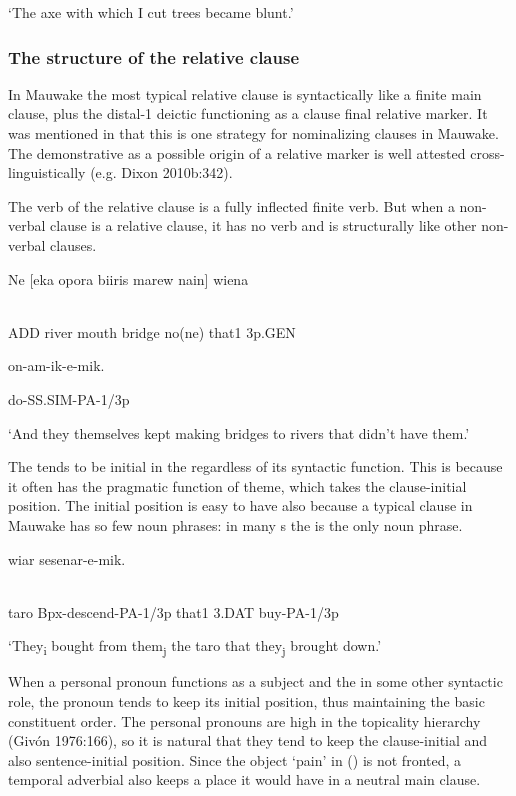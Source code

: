 `The axe with which I cut trees became blunt.'

\subsubsection[The structure of the relative clause ]{The structure of the relative clause} 
\hypertarget{RefHeading23341935131865}{}
In Mauwake the most typical relative clause is syntactically like a finite main clause, plus the distal-1 deictic  functioning as a clause final relative marker. It was mentioned in  that this is one strategy for nominalizing clauses in Mauwake. The demonstrative as a possible origin of a relative marker is well attested cross-linguistically (e.g. Dixon 2010b:342). 

The verb of the relative clause is a fully inflected finite verb. But when a non-verbal clause is a relative clause, it has no verb and is structurally like other non-verbal clauses. 

\ea%
\label{ex:x1943}
\gll Ne  [eka  opora  biiris  marew  nain]  wiena \\
      \\
\glt
\z

ADD  river  mouth  bridge  no(ne)  that1  3p.GEN  

on-am-ik-e-mik.

do-SS.SIM-PA-1/3p

`And they themselves kept making bridges to rivers that didn't have them.'

The  tends to be initial in the  regardless of its syntactic function. This is because it often has the pragmatic function of theme, which takes the clause-initial position. The initial position is easy to have also because a typical clause in Mauwake has so few noun phrases: in many s the  is the only noun phrase. 

\ea%
\label{ex:x1552}
  wiar  sesenar-e-mik. \\
      \\
\glt
\z

taro  Bpx-descend-PA-1/3p  that1  3.DAT  buy-PA-1/3p

`They\textsubscript{i} bought from them\textsubscript{j} the taro that they\textsubscript{j} brought down.'

When a personal pronoun functions as a subject and the  in some other syntactic role, the pronoun tends to keep its initial position, thus maintaining the basic constituent order. The personal pronouns are high in the topicality hierarchy (Giv\'on 1976:166), so it is natural that they tend to keep the clause-initial and also sentence-initial position.  Since the object  `pain' in () is not fronted, a temporal adverbial also keeps a place it would have in a neutral main clause. 

